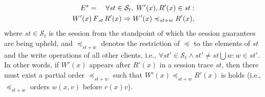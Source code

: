 \documentclass[journal,compsoc]{IEEEtran}
\begin{document}
\begin{align}\label{eqn:RYW}
  \begin{split}
  E^{s} = \quad \forall st \in \mathcal{S}_t, \;  {W}'(x), {R}'(x) \in \mathit{st} : \\
  {W}'(x) \operatorname{\it F}_\mathit{st} {R}'(x)
 \Rightarrow 
 {W}'(x) \preccurlyeq_{\mathit{st}+w} {R}'(x),
  \end{split}
  \end{align} where $\mathit{st}\in \mathcal{S}_t$ is the session from the standpoint of which the session guarantees are being upheld, and $\preccurlyeq_{\mathit{st}+w}$ denotes the restriction of $\preccurlyeq$ to the elements of $\mathit{st}$ and the write operations of all other clients, i.e., $\forall \mathit{st}' \in \mathcal{S}_t \wedge \mathit{st}' \not = \mathit{st} \bigcup {w : w \in
\mathit{st}'}$. %
 In other words, if ${W}'(x)$ %
 appears after ${R}'(x)$ in a session trace $\mathit{st}$, %
  then there must exist a partial order $\preccurlyeq_{\mathit{st}+w}$ such that ${W}'(x) \preccurlyeq_{\mathit{st}+w} {R}'(x)$ is holds (i.e., $\preccurlyeq_{\mathit{st}+w}$ orders $w(x,v)$ before $r(x){v}$).  
\end{document}
